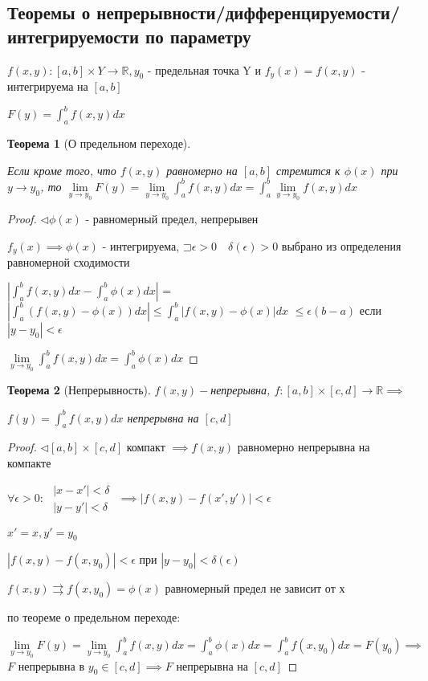 \documentclass[a4paper, 12pt]{article}
\newcommand\letsymbol{\mathord{\sqsupset}}
\newtheorem{theorem}{Теорема}[section]
\theoremstyle{definition}
\theoremstyle{remark}
\begin{document}
\subsection{Теоремы о непрерывности/дифференцируемости/интегрируемости по параметру}
$f(x,y): [a,b]\times Y\rightarrow\mathbb{R}, y_0$ - предельная точка Y и 
$f_y(x) = f(x,y)$ - интегрируема на $[a,b]$

$F(y) = \int_{a}^bf(x,y)dx$
\begin{theorem}[О предельном переходе] \hypertarget{p2}{}
     Если кроме того, что $f(x,y)$ равномерно на $[a,b]$ стремится к $\phi(x)$ при $y\to y_0$, то
     $\lim\limits_{y\to y_0}F(y) = \lim\limits_{y\to y_0}\int_{a}^bf(x,y)dx = \int_{a}^b \lim\limits_{y\to y_0} f(x,y)dx$
\end{theorem}
\begin{proof}
     $\triangleleft \phi(x)$ - равномерный предел, непрерывен

$f_y(x)\implies \phi(x) $ - интегрируема, $\letsymbol{} \epsilon > 0 \quad \delta(\epsilon)>0$ выбрано из
определения равномерной сходимости

$|\int_{a}^bf(x,y)dx - \int_{a}^b\phi(x)dx|$ = $|\int_{a}^b(f(x,y) - \phi(x))dx| \leq \int_{a}^b|f(x,y) - \phi(x)|dx$
$\leq \epsilon(b-a)$ если $|y - y_0|<\epsilon$

$\lim\limits_{y\to y_0}\int_{a}^b f(x,y)dx = \int_{a}^b \phi(x) dx$
\end{proof}
\begin{theorem}[Непрерывность]
     $f(x,y) - $непрерывна, $f: [a,b]\times [c,d]\rightarrow \mathbb{R} \implies$

     $f(y) = \int_{a}^b f(x,y)dx $ непрерывна на $[c,d]$
\end{theorem}
\begin{proof}
     $\triangleleft [a,b]\times [c,d]$ компакт $\implies f(x,y)$ равномерно непрерывна на компакте

$\forall \epsilon>0:$
$
     \begin{array}{l}
          |x - x'|< \delta\\
          |y - y'|<\delta
     \end{array}
     $
     $\implies |f(x,y) - f(x', y')|<\epsilon$

     $x' = x, y' = y_0$

     $|f(x,y) - f(x,y_0)|<\epsilon$ при $|y - y_0|< \delta(\epsilon)$

     $f(x,y) \rightrightarrows f(x, y_0) = \phi(x)$ равномерный предел не зависит от х 

     по теореме о предельном переходе:
     
     $\lim\limits_{y\to y_0} F(y) = \lim\limits_{y\to y_0} \int_{a}^b f(x,y)dx = \int_{a}^b \phi(x) dx = \int_{a}^b f(x,y_0)dx  = F(y_0)\implies$
     $F$ непрерывна в $y_0 \in [c,d]\implies F$ непрерывна на $[c,d] $
\end{proof}
\end{document}
